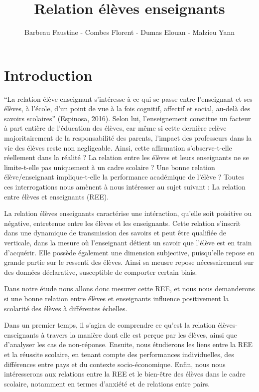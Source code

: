 \documentclass[
  french,
  11pt,
  a4paper,
  oneside]{report}
\title{Relation élèves enseignants}
\author{Barbeau Faustine - Combes Florent - Dumas Elouan - Malzieu Yann}
\date{}
\renewcommand*\contentsname{Table des matières}
\newcommand\contentsname{Table des matières}
\begin{document}
\maketitle

\renewcommand*\contentsname{Table des matières}
{
\hypersetup{linkcolor=}
\setcounter{tocdepth}{2}
\tableofcontents
}

\renewcommand{\contentsname}{Table des matières}

\chapter{Introduction}\label{introduction}

``La relation élève-enseignant s'intéresse à ce qui se passe entre
l'enseignant et ses élèves, à l'école, d'un point de vue à la fois
cognitif, affectif et social, au-delà des savoirs scolaires'' (Espinosa,
2016). Selon lui, l'enseignement constitue un facteur à part entière de
l'éducation des élèves, car même si cette dernière relève
majoritairement de la responsabilité des parents, l'impact des
professeurs dans la vie des élèves reste non negligeable. Ainsi, cette
affirmation s'observe-t-elle réellement dans la réalité ? La relation
entre les élèves et leurs enseignants ne se limite-t-elle pas uniquement
à un cadre scolaire ? Une bonne relation élève/enseignant
implique-t-elle la performance académique de l'élève ? Toutes ces
interrogations nous amènent à nous intéresser au sujet suivant : La
relation entre élèves et enseignants (REE).

La relation élèves enseignants caractérise une intéraction, qu'elle soit
poisitive ou négative, entretenue entre les élèves et les enseignants.
Cette relation s'inscrit dans une dynamique de transmission des savoirs
et peut être qualifiée de verticale, dans la mesure où l'enseignant
détient un savoir que l'élève est en train d'acquérir. Elle possède
également une dimension subjective, puisqu'elle repose en grande partie
sur le ressenti des élèves. Ainsi sa meusre repose nécessairement sur
des données déclarative, susceptible de comporter certain biais.

Dans notre étude nous allons donc mesurer cette REE, et nous nous
demanderons si une bonne relation entre élèves et enseignants influence
positivement la scolarité des élèves à différentes échelles.

Dans un premier temps, il s'agira de comprendre ce qu'est la relation
élèves-enseignants à travers la manière dont elle est perçue par les
élèves, ainsi que d'analyser les cas de non-réponse. Ensuite, nous
étudierons les liens entre la REE et la réussite scolaire, en tenant
compte des performances individuelles, des différences entre pays et du
contexte socio-économique. Enfin, nous nous intéresserons aux relations
entre la REE et le bien-être des élèves dans le cadre scolaire,
notamment en termes d'anxiété et de relations entre pairs.
\end{document}
